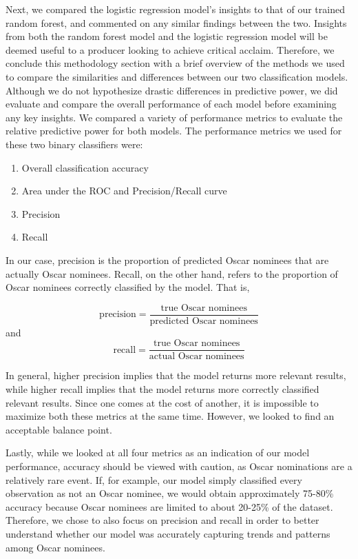 \documentclass[10pt]{article}
\begin{document}
Next, we compared the logistic regression model’s insights to that of our trained random forest, and commented on any similar findings between the two. Insights from both the random forest model and the logistic regression model will be deemed useful to a producer looking to achieve critical acclaim. Therefore, we conclude this methodology section with a brief overview of the methods we used to compare the similarities and differences between our two classification models. Although we do not hypothesize drastic differences in predictive power, we did evaluate and compare the overall performance of each model before examining any key insights. We compared a variety of performance metrics to evaluate the relative predictive power for both models. The performance metrics we used for these two binary classifiers were:

\begin{enumerate}
\item Overall classification accuracy
\item Area under the ROC and Precision/Recall curve
\item Precision
\item Recall
\end{enumerate}

In our case, precision is the proportion of predicted Oscar nominees that are actually Oscar nominees. Recall, on the other hand, refers to the proportion of Oscar nominees correctly classified by the model. That is,

$$\text{precision} = \frac{\text{true Oscar nominees}}{\text{predicted Oscar nominees}}$$
and
$$\text{recall} = \frac{\text{true Oscar nominees}}{\text{actual Oscar nominees}}$$

In general, higher precision implies that the model returns more relevant results, while higher recall implies that the model returns more correctly classified relevant results. Since one comes at the cost of another, it is impossible to maximize both these metrics at the same time. However, we looked to find an acceptable balance point.

Lastly, while we looked at all four metrics as an indication of our model performance, accuracy should be viewed with caution, as Oscar nominations are a relatively rare event. If, for example, our model simply classified every observation as not an Oscar nominee, we would obtain approximately 75-80\% accuracy because Oscar nominees are limited to about 20-25\% of the dataset. Therefore, we chose to also focus on precision and recall in order to better understand whether our model was accurately capturing trends and patterns among Oscar nominees.
\end{document}
